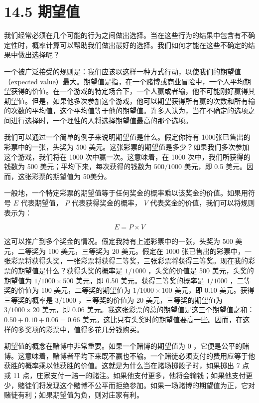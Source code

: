 \section*{14.5 期望值}
我们经常必须在几个可能的行为之间做出选择。当在这些行为的结果中包含有不确定性时，概率计算可以帮助我们做出最好的选择。我们如何才能在这些不确定的结果中做出选择呢？

一个被广泛接受的规则是：我们应该以这样一种方式行动，以使我们的期望值（expected value）最大。期望值是指，在一个赌博或商业冒险中，一个人平均期望获得的价值。在一个游戏的特定场合下，一个人赢或者输，他不可能刚好赢得其期望值。但是，如果他多次参加这个游戏，他可以期望获得所有赢的次数和所有输的次数的平均值，这个平均值等于他的期望值。许多人认为，当在不确定的选项之间进行选择时，一个理性的人将选择期望值最高的那个选项。

我们可以通过一个简单的例子来说明期望值是什么。假定你持有 1000张已售出的彩票中的一张，头奖为 500 美元。这张彩票的期望值是多少？如果我们多次参加这个游戏，我们将在 1000 次中赢一次。这意味着，在 1000 次中，我们所获得的钱数为 500 美元；平均下来，每次获得的钱数为 $500 / 1000$ 美元，即 0.5 美元。因而，这张彩票的期望值为 50美分。

一般地，一个特定彩票的期望值等于任何奖金的概率乘以该奖金的价值。如果用符号 $E$ 代表期望值， $P$ 代表获得奖金的概率， $V$ 代表奖金的价值，我们可以将规则表示为：

$$
E=P \times V
$$

这可以推广到多个奖金的情况。假定我持有上述彩票中的一张，头奖为 500 美元，二等奖为 100 美元，三等奖为 20 美元。假定在 1000 张已售出的彩票中，一张彩票将获得头奖，一张彩票将获得二等奖，三张彩票将获得三等奖。现在我的彩票的期望值是什么？获得头奖的概率是 $1 / 1000$ ，头奖的价值是 500 美元，头奖的期望值为 $1 / 1000 \times 500$ 美元，即 0.50 美元。获得二等奖的概率是 $1 / 1000$ ，二等奖的价值为 100 美元，二等奖的期望值为 $1 / 1000 \times 100$ 美元，即 0.10 美元。获得三等奖的概率是 $3 / 1000$ ，三等奖的价值为 20 美元，三等奖的期望值为 $3 / 1000 \times 20$ 美元，即 0.06 美元。我这张彩票的总的期望值是这三个期望值之和： $0.50+0.10+0.06=0.66$ 美元。这比只有头奖时的期望值要高一些。因而，在这样的多奖项的彩票中，值得多花几分钱购买。

期望值的概念在赌博中非常重要。如果一个赌博的期望值为 0 ，它便是公平的赌博。这意味着，赌博者平均下来既不赢也不输。一个赌徒必须支付的费用应等于他获胜的概率乘以他获胜的价值。这就是为什么当在赌场掷骰子时，如果掷出 7 点或 11 点，庄家支付一赔一的赌注。如果他支付更多，他将会输钱；如果他支付更少，赌徒们将发现这个赌博不公平而拒绝参加。如果一场赌博的期望值为正，它对赌徒有利；如果期望值为负，则对庄家有利。

